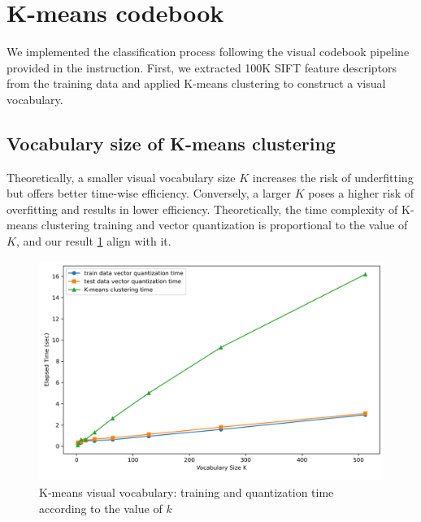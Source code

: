 \section{K-means codebook}
\label{sec:intro}

We implemented the classification process following the visual codebook pipeline provided in the instruction. First, we extracted 100K SIFT feature descriptors from the training data and applied K-means clustering to construct a visual vocabulary.

\subsection{Vocabulary size of K-means clustering}
Theoretically, a smaller visual vocabulary size $K$ increases the risk of underfitting but offers better time-wise efficiency. Conversely, a larger $K$ poses a higher risk of overfitting and results in lower efficiency. Theoretically, the time complexity of K-means clustering training and vector quantization is proportional to the value of $K$, and our result \cref{fig:q1-fig1} align with it.

\begin{figure}[htbp]
	\centering
	\includegraphics[width=0.5\linewidth]{image/q1-fig1.png}
	\caption{K-means visual vocabulary: training and quantization time according to the value of $k$}
	\label{fig:q1-fig1}
\end{figure}

